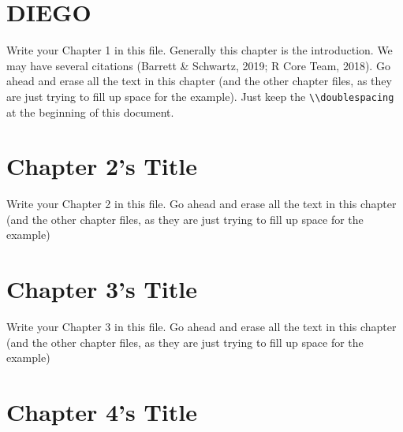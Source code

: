 \documentclass{DissertateUSU}
\begin{document}
\newpage
\fancyhead[R]{\thepage}
\fancyfoot[C]{}
\listoffigures

\newpage
{}

\newpage
\fancyhead[R]{\thepage}
\fancyfoot[C]{}

\chapter{DIEGO}

\doublespacing

Write your Chapter 1 in this file. Generally this chapter is the
introduction. We may have several citations (Barrett \& Schwartz, 2019;
R Core Team, 2018). Go ahead and erase all the text in this chapter (and
the other chapter files, as they are just trying to fill up space for
the example). Just keep the
\texttt{\textbackslash{}\textbackslash{}doublespacing} at the beginning
of this document.

\lipsum

\FloatBarrier
\newpage
\fancyhead[R]{\thepage}
\fancyfoot[C]{}

\chapter{Chapter 2's Title}

\doublespacing

Write your Chapter 2 in this file. Go ahead and erase all the text in
this chapter (and the other chapter files, as they are just trying to
fill up space for the example)

\lipsum

\FloatBarrier
\newpage
\fancyhead[R]{\thepage}
\fancyfoot[C]{}

\chapter{Chapter 3's Title}

\doublespacing

Write your Chapter 3 in this file. Go ahead and erase all the text in
this chapter (and the other chapter files, as they are just trying to
fill up space for the example)

\lipsum

\FloatBarrier
\newpage
\fancyhead[R]{\thepage}
\fancyfoot[C]{}

\chapter{Chapter 4's Title}
\end{document}
